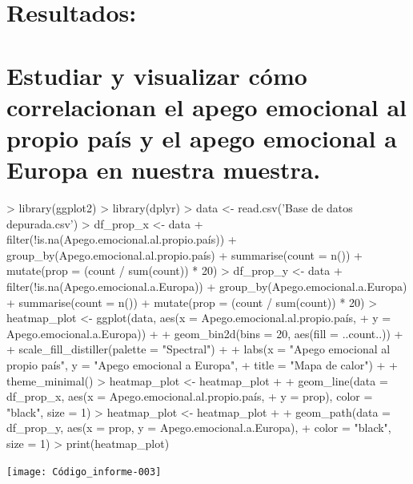 \documentclass{article}
\begin{document}
\section*{Resultados:}

\section{Estudiar y visualizar cómo correlacionan el apego emocional al propio país y el apego emocional a Europa en nuestra muestra.}

\begin{Schunk}
\begin{Sinput}
> library(ggplot2)
> library(dplyr)
> data <- read.csv('Base de datos depurada.csv')
> df_prop_x <- data %
+   filter(!is.na(Apego.emocional.al.propio.país)) %
+   group_by(Apego.emocional.al.propio.país) %
+   summarise(count = n()) %
+   mutate(prop = (count / sum(count)) * 20)
> df_prop_y <- data %
+   filter(!is.na(Apego.emocional.a.Europa)) %
+   group_by(Apego.emocional.a.Europa) %
+   summarise(count = n()) %
+   mutate(prop = (count / sum(count)) * 20)
> heatmap_plot <- ggplot(data, aes(x = Apego.emocional.al.propio.país,
+                                  y = Apego.emocional.a.Europa)) +
+   geom_bin2d(bins = 20, aes(fill = ..count..)) +
+   scale_fill_distiller(palette = "Spectral") +
+   labs(x = "Apego emocional al propio país", y = "Apego emocional a Europa",
+        title = "Mapa de calor") +
+   theme_minimal()
> heatmap_plot <- heatmap_plot +
+   geom_line(data = df_prop_x, aes(x = Apego.emocional.al.propio.país,
+                                   y = prop), color = "black", size = 1)
> heatmap_plot <- heatmap_plot +
+   geom_path(data = df_prop_y, aes(x = prop, y = Apego.emocional.a.Europa),
+             color = "black", size = 1)
> print(heatmap_plot)
\end{Sinput}
\end{Schunk}
\texttt{[image: Código\_informe-003]}

\newpage
\end{document}
